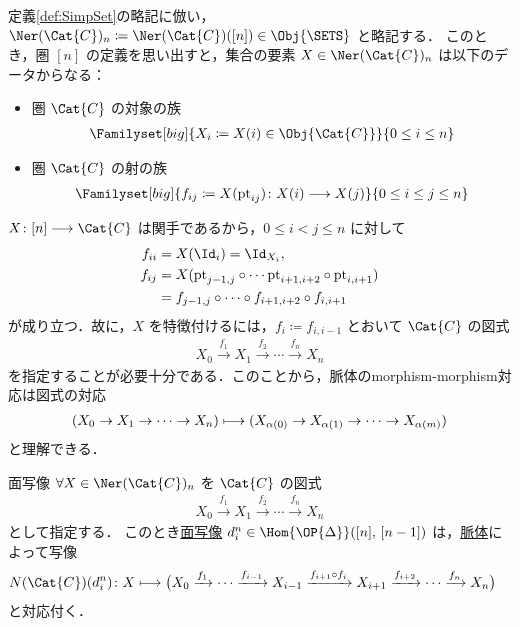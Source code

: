 \documentclass[TQFT_main]{subfiles}
\begin{document}
定義\ref{def:SimpSet}の略記に倣い，$\Ner (\Cat{C})_n \coloneqq \Ner  (\Cat{C})([n]) \in \Obj{\SETS}$ と略記する．
このとき，圏 $[n]$ の定義を思い出すと，集合の要素 $X \in \Ner (\Cat{C})_n$ は以下のデータからなる：
\begin{itemize}
    \item 圏 $\Cat{C}$ の対象の族
    \begin{align}
        \Familyset[big]{X_i \coloneqq X (i) \in \Obj{\Cat{C}} }{0 \le i \le n}
    \end{align}
    \item 圏 $\Cat{C}$ の射の族
    \begin{align}
        \Familyset[big]{f_{ij} \coloneqq X(\mathrm{pt}_{ij}) \colon X(i) \lto X(j)}{0 \le i \le j \le n}
    \end{align}
\end{itemize}
$X \colon [n] \lto \Cat{C}$ は関手であるから，$0 \le i < j \le n$ に対して
\begin{align}
    f_{ii} &= X(\Id_i) = \Id_{X_i}, \\
    f_{ij} &= X(\mathrm{pt}_{j-1,j} \circ \cdots \mathrm{pt}_{i+1,i+2}\circ\mathrm{pt}_{i,i+1}) \\
    &= f_{j-1,j} \circ \cdots \circ f_{i+1,i+2} \circ f_{i,i+1}
\end{align}
が成り立つ．故に，$X$ を特徴付けるには，$f_i \coloneqq f_{i,i-1}$ とおいて $\Cat{C}$ の図式
\begin{align}
    \label{eq:nerve-spine}
    X_0 \xrightarrow{f_1} X_1 \xrightarrow{f_2} \cdots \xrightarrow{f_n} X_n
\end{align}
を指定することが必要十分である．このことから，脈体のmorphism-morphism対応は図式の対応
\begin{align}
    (X_0 \to X_1 \to \cdots \to X_n) \longmapsto (X_{\alpha(0)} \to X_{\alpha(1)} \to \cdots \to X_{\alpha(m)})
\end{align}
と理解できる．

\begin{myexample}[label=ex:nerve-face]{面写像}
    $\forall X \in \Ner (\Cat{C})_n$ を $\Cat{C}$ の図式
    \begin{align}
        X_0 \xrightarrow{f_1} X_1 \xrightarrow{f_2} \cdots \xrightarrow{f_n} X_n
    \end{align}
    として指定する．
    このとき\hyperref[def:simplex-cat]{面写像} $d^n_i \in \Hom{\OP{\Delta}}([n],\, [n-1])$ は，\hyperref[def:nerve]{脈体}によって写像
    \begin{align}
        N(\Cat{C})(d^n_i)\colon 
        X &\lmto \bigl( X_0 \xrightarrow{f_1} \cdots \xrightarrow{f_{i-1}} X_{i-1} \xrightarrow{f_{i+1} \circ f_{i}} X_{i+1} \xrightarrow{f_{i+2}} \cdots \xrightarrow{f_n} X_n \bigr) 
    \end{align}
    と対応付く．
\end{myexample}
\end{document}

